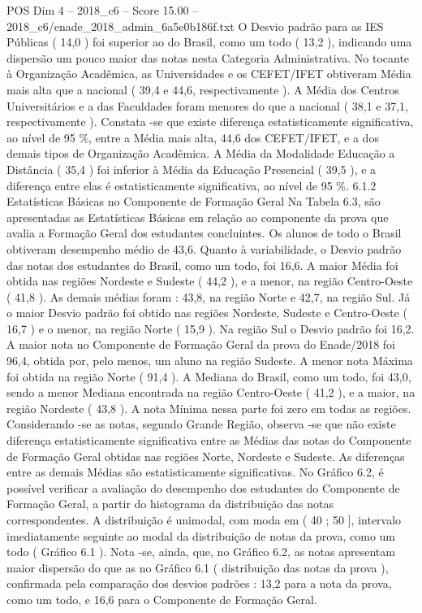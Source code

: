 \begin{textsample}{POS Dim 4 – 2018\_c6 – Score 15.00 – 2018\_c6/enade\_2018\_admin\_6a5e0b186f.txt}
O Desvio padrão para as IES Públicas ( 14,0 ) foi superior ao do Brasil, como um todo ( 13,2 ), indicando uma dispersão um pouco maior das notas nesta Categoria Administrativa.
No tocante à Organização Acadêmica, as Universidades e os CEFET/IFET obtiveram Média mais alta que a nacional ( 39,4 e 44,6, respectivamente ).
A Média dos Centros Universitários e a das Faculdades foram menores do que a nacional ( 38,1 e 37,1, respectivamente ).
Constata -se que existe diferença estatisticamente significativa, ao nível de 95 \%, entre a Média mais alta, 44,6 dos CEFET/IFET, e a dos demais tipos de Organização Acadêmica.
A Média da Modalidade Educação a Distância ( 35,4 ) foi inferior à Média da Educação Presencial ( 39,5 ), e a diferença entre elas é estatisticamente significativa, ao nível de 95 \%. 6.1.2 Estatísticas Básicas no Componente de Formação Geral Na Tabela 6.3, são apresentadas as Estatísticas Básicas em relação ao componente da prova que avalia a Formação Geral dos estudantes concluintes.
Os alunos de todo o Brasil obtiveram desempenho médio de 43,6.
Quanto à variabilidade, o Desvio padrão das notas dos estudantes do Brasil, como um todo, foi 16,6.
A maior Média foi obtida nas regiões Nordeste e Sudeste ( 44,2 ), e a menor, na região Centro-Oeste ( 41,8 ).
As demais médias foram : 43,8, na região Norte e 42,7, na região Sul.
Já o maior Desvio padrão foi obtido nas regiões Nordeste, Sudeste e Centro-Oeste ( 16,7 ) e o menor, na região Norte ( 15,9 ).
Na região Sul o Desvio padrão foi 16,2.
A maior nota no Componente de Formação Geral da prova do Enade/2018 foi 96,4, obtida por, pelo menos, um aluno na região Sudeste.
A menor nota Máxima foi obtida na região Norte ( 91,4 ).
A Mediana do Brasil, como um todo, foi 43,0, sendo a menor Mediana encontrada na região Centro-Oeste ( 41,2 ), e a maior, na região Nordeste ( 43,8 ).
A nota Mínima nessa parte foi zero em todas as regiões.
Considerando -se as notas, segundo Grande Região, observa -se que não existe diferença estatisticamente significativa entre as Médias das notas do Componente de Formação Geral obtidas nas regiões Norte, Nordeste e Sudeste.
As diferenças entre as demais Médias são estatisticamente significativas.
No Gráfico 6.2, é possível verificar a avaliação do desempenho dos estudantes do Componente de Formação Geral, a partir do histograma da distribuição das notas correspondentes.
A distribuição é unimodal, com moda em ( 40 ; 50 ], intervalo imediatamente seguinte ao modal da distribuição de notas da prova, como um todo ( Gráfico 6.1 ).
Nota -se, ainda, que, no Gráfico 6.2, as notas apresentam maior dispersão do que as no Gráfico 6.1 ( distribuição das notas da prova ), confirmada pela comparação dos desvios padrões : 13,2 para a nota da prova, como um todo, e 16,6 para o Componente de Formação Geral.

\end{textsample}
